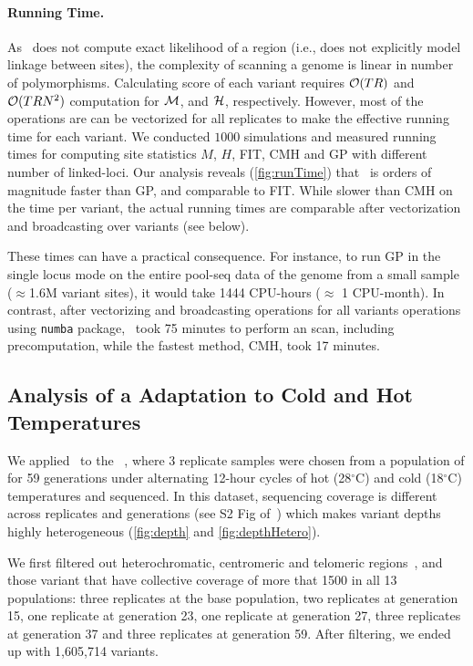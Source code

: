 \paragraph{Running Time.}
As \comale\ does not compute exact likelihood of a region (i.e., does
not explicitly model linkage between sites), the complexity of
scanning a genome is linear in number of polymorphisms.  Calculating
score of each variant requires ${\cal O}(TR)$ and ${\cal O}(TRN^2)$ computation
for ${\cal M}$, and ${\cal H}$, respectively. However, most of the operations
are can be vectorized for all replicates to make the effective running
time for each variant.  We
conducted $1000$ simulations and measured running times for computing site 
statistics $M$, $H$, FIT, CMH and GP with different number of linked-loci.  Our
analysis reveals (\ref{fig:runTime}) that \comale\ is orders of
magnitude faster than GP, and comparable to FIT. While slower than CMH
on the time per variant, the actual running times are comparable after
vectorization and broadcasting over variants (see below).

These times can have a practical consequence. For instance, to run GP
in the single locus mode on the entire pool-seq data of the \dmel genome from a
small sample ($\approx$1.6M variant sites), it would take 1444 CPU-hours
($\approx$ 1 CPU-month). In contrast, after vectorizing and
broadcasting operations for all variants operations using
\texttt{numba} package, \comale\ took 75 minutes to perform an
scan, including precomputation, while the fastest method, CMH, took 17 minutes.

\subsection{Analysis of a \dmel Adaptation to Cold and Hot 
Temperatures}\label{sec:dmel}
We applied \comale\ to the 
\datadm~\cite{orozco2012adaptation,franssen2015patterns}, where
3 replicate samples were chosen from a population of \dmel for 59
generations under alternating 12-hour cycles of hot (28$^{\circ}$C)
and cold (18$^{\circ}$C) temperatures and sequenced.  In this dataset,
sequencing coverage is different across replicates and generations
(see S2 Fig of~\cite{Terhorst2015Multi}) which makes variant depths
highly heterogeneous (\ref{fig:depth} and \ref{fig:depthHetero}). 

We first filtered out heterochromatic,
centromeric and telomeric
regions~\cite{fiston2010drosophila}, and those variant that have collective 
coverage of more that 1500 in all 13 populations: three replicates at the base 
population, two replicates at generation 15, one replicate at generation 23, 
one replicate at generation 27, three replicates at generation 37 and three 
replicates at generation 59. After filtering, we ended up with 1,605,714 
variants.

